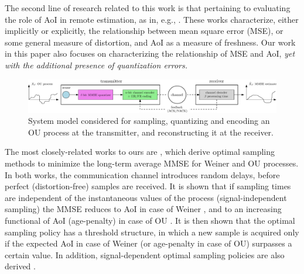 \documentclass[12pt,journal,onecolumn]{IEEEtran}
\begin{document}
The second line of research related to this work is that pertaining to evaluating the role of AoI in remote estimation, as in, e.g., \cite{chakravorty-distortion-gauss-markov, gao-estimation-ltd-measurements, yun-monitoring-comm-cost, ayan-aoi-voi-cntrl, mitra-estimation-graphs-aoi, roth-mse-aoi-finite-blocklength, chakravorty-estimation-pckt-drop-markov, sun-weiner, ornee-aoi-estimation-ou, huang-estimation-harq-control, maatouk-aoii, ramirez-aoi-compression, bastopcu-aoi-distortion, bastopcu-partial-updates}. These works characterize, either implicitly or explicitly, the relationship between mean square error (MSE), or some general measure of distortion, and AoI as a measure of freshness. Our work in this paper also focuses on characterizing the relationship of MSE and AoI, {\it yet with the additional presence of quantization errors.}

\begin{figure}[t]
\center
\includegraphics[scale=.375]{sys_mod}
\caption{System model considered for sampling, quantizing and encoding an OU process at the transmitter, and reconstructing it at the receiver.}
\label{fig_sys_mod}
\end{figure}


The most closely-related works to ours are \cite{sun-weiner, ornee-aoi-estimation-ou}, which derive optimal sampling methods to minimize the long-term average MMSE for Weiner \cite{sun-weiner} and OU \cite{ornee-aoi-estimation-ou} processes. In both works, the communication channel introduces random delays, before perfect (distortion-free) samples are received. It is shown that if sampling times are independent of the instantaneous values of the process (signal-independent sampling) the MMSE reduces to AoI in case of Weiner \cite{sun-weiner}, and to an increasing functional of AoI (age-penalty) in case of OU \cite{ornee-aoi-estimation-ou}. It is then shown that the optimal sampling policy has a threshold structure, in which a new sample is acquired only if the expected AoI in case of Weiner (or age-penalty in case of OU) surpasses a certain value. In addition, signal-dependent optimal sampling policies are also derived \cite{sun-weiner, ornee-aoi-estimation-ou}.
\end{document}

